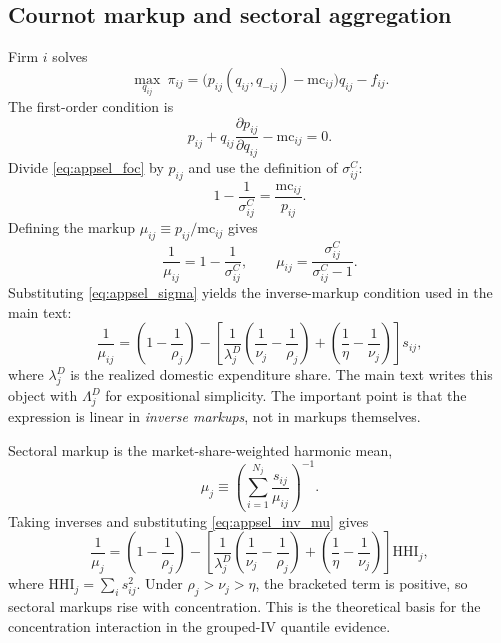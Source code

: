 \subsection{Cournot markup and sectoral aggregation}

Firm $i$ solves
\[
\max_{q_{ij}} \ \pi_{ij}
=
\bigl(p_{ij}(q_{ij},q_{-ij})-\text{mc}_{ij}\bigr)q_{ij}-f_{ij}.
\]
The first-order condition is
\begin{equation}
p_{ij}
+ q_{ij}\frac{\partial p_{ij}}{\partial q_{ij}}
- \text{mc}_{ij}
= 0.
\label{eq:appsel_foc}
\end{equation}
Divide \eqref{eq:appsel_foc} by $p_{ij}$ and use the definition of $\sigma_{ij}^C$:
\[
1 - \frac{1}{\sigma_{ij}^C} = \frac{\text{mc}_{ij}}{p_{ij}}.
\]
Defining the markup $\mu_{ij} \equiv p_{ij}/\text{mc}_{ij}$ gives
\begin{equation}
\frac{1}{\mu_{ij}} = 1 - \frac{1}{\sigma_{ij}^C},
\qquad
\mu_{ij} = \frac{\sigma_{ij}^C}{\sigma_{ij}^C-1}.
\label{eq:appsel_mu_sigma}
\end{equation}
Substituting \eqref{eq:appsel_sigma} yields the inverse-markup condition used in the main text:
\begin{equation}
\frac{1}{\mu_{ij}}
=
\left(1-\frac{1}{\rho_j}\right)
-
\left[
\frac{1}{\lambda_j^D}\left(\frac{1}{\nu_j}-\frac{1}{\rho_j}\right)
+
\left(\frac{1}{\eta}-\frac{1}{\nu_j}\right)
\right] s_{ij},
\label{eq:appsel_inv_mu}
\end{equation}
where $\lambda_j^D$ is the realized domestic expenditure share. The main text writes this object with $\Lambda_j^D$ for expositional simplicity. The important point is that the expression is linear in \emph{inverse markups}, not in markups themselves.

Sectoral markup is the market-share-weighted harmonic mean,
\[
\mu_j
\equiv
\left(\sum_{i=1}^{N_j} \frac{s_{ij}}{\mu_{ij}}\right)^{-1}.
\]
Taking inverses and substituting \eqref{eq:appsel_inv_mu} gives
\begin{equation}
\frac{1}{\mu_j}
=
\left(1-\frac{1}{\rho_j}\right)
-
\left[
\frac{1}{\lambda_j^D}\left(\frac{1}{\nu_j}-\frac{1}{\rho_j}\right)
+
\left(\frac{1}{\eta}-\frac{1}{\nu_j}\right)
\right]\text{HHI}_j,
\label{eq:appsel_sector_mu}
\end{equation}
where $\text{HHI}_j = \sum_i s_{ij}^2$. Under $\rho_j > \nu_j > \eta$, the bracketed term is positive, so sectoral markups rise with concentration. This is the theoretical basis for the concentration interaction in the grouped-IV quantile evidence.


